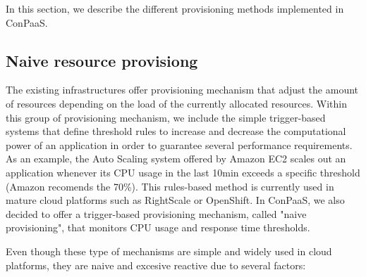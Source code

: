 In this section, we describe the different provisioning methods implemented in ConPaaS.



\subsection{Naive resource provisiong}

The existing infrastructures offer provisioning mechanism that adjust the amount of resources depending on the load of the currently allocated resources. Within this group of provisioning mechanism, we include the simple trigger-based systems that define threshold rules to increase and decrease the computational power of an application in order to guarantee several performance requirements. As an example, the Auto Scaling system offered by Amazon EC2 scales out an application whenever its CPU usage in the last 10min exceeds a specific threshold (Amazon recomends the 70\%).  This rules-based method is currently used in mature cloud platforms such as RightScale or OpenShift. In ConPaaS, we also decided to offer a trigger-based provisioning mechanism, called "naive provisioning", that monitors CPU usage and response time thresholds. 


Even though these type of mechanisms are simple and widely used in cloud platforms, they are naive and excesive reactive due to several factors: 


